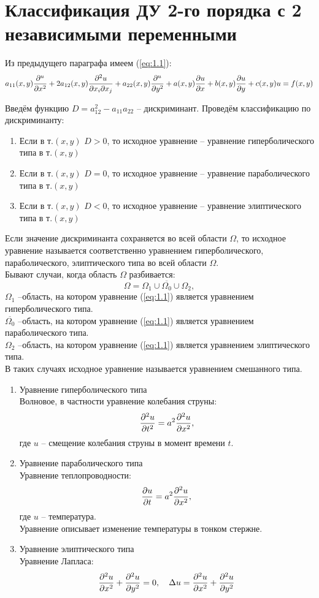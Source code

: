 \documentclass[../main.tex]{subfiles}
\begin{document}
\section{Классификация ДУ 2-го порядка с 2 независимыми переменными}
Из предыдущего параграфа имеем (\ref{eq:1.1}):
\[
	a_{11}(x,y)\frac{\partial ^u}{\partial x^2} + 2a_{12}(x,y)\frac{\partial ^2u}{\partial x_i \partial{x_j}} +
	a_{22}(x,y)\frac{\partial ^u}{\partial y^2} + a(x,y)\frac{\partial u}{\partial x} + b(x,y)\frac{\partial u}{\partial y} + c(x,y)u = f(x,y)
\]

Введём функцию $D = a_{12}^2-a_{11}a_{22}$ -- дискриминант.
Проведём классификацию по дискриминанту:
\begin{enumerate}
	\item
	      Если в т.$(x,y)$ $D>0$, то исходное уравнение --
	      уравнение гиперболического типа в т.$(x,y)$
	\item
	      Если в т.$(x,y)$ $D=0$, то исходное уравнение --
	      уравнение параболического типа в т.$(x,y)$
	\item
	      Если в т.$(x,y)$ $D<0$, то исходное уравнение --
	      уравнение элиптического типа в т.$(x,y)$
\end{enumerate}

Если значение дискриминанта сохраняется во всей области $\Omega$,
то исходное уравнение называется соответственно уравнением гиперболического,
параболического, элиптического типа во всей области $\Omega$.\\

Бывают случаи, когда область $\Omega$ разбивается:
\[\Omega = \Omega_1 \cup \overline{\Omega_0} \cup \Omega_2, \]
$\Omega_1$ --область, на котором уравнение (\ref{eq:1.1}) является уравнением гиперболического типа.\\
$\overline{\Omega_0}$ --область, на котором уравнение (\ref{eq:1.1}) является уравнением параболического типа.\\
$\Omega_2$ --область, на котором уравнение (\ref{eq:1.1}) является уравнением элиптического типа.\\
В таких случаях исходное уравнение называется уравнением смешанного типа.

\begin{enumerate}
	\item Уравнение гиперболического типа\\
	      Волновое, в частности уравнение колебания струны:
	      \[\frac{\partial ^2u}{\partial t^2}=a^2\frac{\partial ^2u}{\partial x^2},\]
	      где $u$ -- смещение колебания струны в момент времени $t$.
	\item Уравнение параболического типа\\
	      Уравнение теплопроводности:
	      \[\frac{\partial u}{\partial t}=a^2\frac{\partial ^2u}{\partial x^2},\]
	      где $u$ -- температура.\\
	      Уравнение описывает изменение температуры в тонком стержне.
	\item Уравнение элиптического типа\\
	      Уравнение Лапласа:
	      \[
		      \frac{\partial ^2u}{\partial x^2}+\frac{\partial ^2u}{\partial y^2} = 0,\quad
		      \Delta u=\frac{\partial ^2u}{\partial x^2}+\frac{\partial ^2u}{\partial y^2}
	      \]
\end{enumerate}
\end{document}
